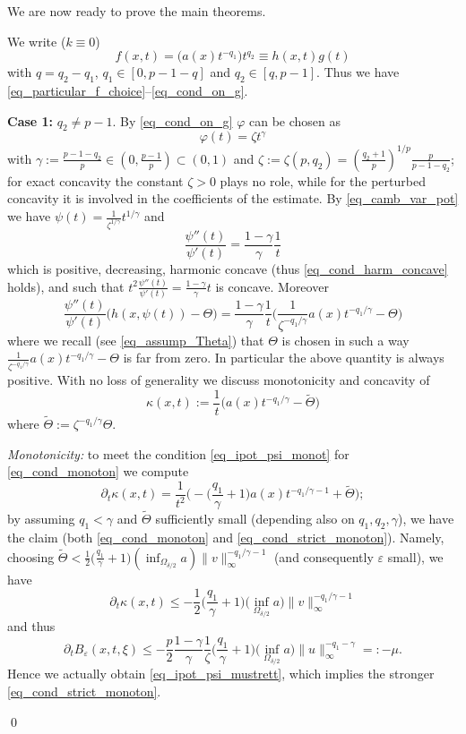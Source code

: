 \documentclass[11pt, reqno]{amsart}
\theoremstyle{definition}
\numberwithin{equation}{section}
\def\eps{\varepsilon}
\def\norm#1{\|#1\|}
\renewenvironment{proof}[1][\proofname]{\medskip \noindent {\bfseries #1. }}{\qed \bigskip}
\begin{document}
We are now ready to prove the main theorems.

\begin{proof}[Proof of Theorem \ref{thm_main_conc_exact}] 
We write ($k\equiv 0$)
\begin{equation}\label{eq_singular_decompos}
f(x,t) = \big(a(x) t^{-q_1}\big) t^{q_2} \equiv h(x,t) g(t) 
\end{equation}
with $ q= q_2 -q_1 $, $q_1 \in [0, p-1-q]$ and $q_2 \in [q,p-1]$. 
Thus we have \eqref{eq_particular_f_choice}--\eqref{eq_cond_on_g}.

\textbf{Case 1:} $q_2 \neq p-1$. By \eqref{eq_cond_on_g} $\varphi$ can be chosen as
\begin{equation}\label{eq_camb_var_pot}
\varphi(t)= \zeta t^{\gamma}
\end{equation}
with $\gamma := \frac{p-1-q_2}{p} \in (0,\frac{p-1}{p}) \subset (0,1)$ and $\zeta := \zeta(p,q_2)= \left(\frac{q_2+1}{p}\right)^{1/p} \frac{p}{p-1-q_2}$; for exact concavity the constant $\zeta>0$ plays no role, while for the perturbed concavity it is involved in the coefficients of the estimate. 
By \eqref{eq_camb_var_pot} we have $\psi(t)= \frac{1}{\zeta^{1/\gamma}} t^{1/\gamma}$ and
$$\frac{\psi''(t)}{\psi'(t)} = \frac{1-\gamma}{\gamma} \frac{1}{t}$$
which is positive, decreasing, harmonic concave (thus \eqref{eq_cond_harm_concave} holds), and such that $t^2\frac{\psi''(t)}{\psi'(t)} = \frac{1-\gamma}{\gamma} t$ is concave. 
Moreover
$$ \frac{\psi''(t)}{\psi'(t)} \big(h(x,\psi(t))-\Theta \big) = \frac{1-\gamma}{\gamma} \frac{1}{t} \bigg(\frac{1}{\zeta^{-q_1/\gamma}} a(x) t^{-q_1/\gamma} - \Theta \bigg)$$
where we recall (see \eqref{eq_assump_Theta}) that $\Theta$ is chosen in such a way $\frac{1}{\zeta^{-q_1/\gamma}} a(x) t^{-q_1/\gamma} - \Theta$ is far from zero. 
In particular the above quantity is always positive. 
With no loss of generality we discuss monotonicity and concavity of
$$\kappa(x,t):= \frac{1}{t} \big( a(x) t^{-q_1/\gamma} -\tilde{\Theta} \big)$$
where $\tilde{\Theta} := \zeta^{-q_1/\gamma} \Theta$.

\medskip

\emph{Monotonicity:} to meet the condition \eqref{eq_ipot_psi_monot} for \eqref{eq_cond_monoton} we compute
$$\partial_t \kappa(x,t)= \frac{1}{t^2} \Big(- \Big(\frac{q_1}{\gamma}+1\Big) a(x) t^{-q_1/\gamma-1} + \tilde{\Theta}\Big);$$
by assuming $q_1 < \gamma$ and $\tilde{\Theta}$ sufficiently small (depending also on $q_1, q_2, \gamma$), we have the claim (both \eqref{eq_cond_monoton} and \eqref{eq_cond_strict_monoton}). 
Namely, choosing $\tilde{\Theta} < \frac{1}{2} \big(\frac{q_1}{\gamma}+1\big) (\inf_{\Omega_{\delta/2}} a) \norm{v}_{\infty}^{-q_1/\gamma-1}$ (and consequently $\eps$ small), we have
$$\partial_t \kappa(x,t) \leq -\frac{1}{2} \Big(\frac{q_1}{\gamma}+1\Big) \Big(\inf_{\Omega_{\delta/2}} a\Big) \norm{v}_{\infty}^{-q_1/\gamma-1}$$
and thus
$$\partial_t B_{\eps}(x,t,\xi) \leq - \frac{p}{2} \frac{1-\gamma}{\gamma} \frac{1}{\zeta} \Big(\frac{q_1}{\gamma}+1\Big) \Big(\inf_{\Omega_{\delta/2}} a\Big) \norm{u}_{\infty}^{-q_1-\gamma}=: - \mu .$$
Hence we actually obtain \eqref{eq_ipot_psi_mustrett}, which implies the stronger \eqref{eq_cond_strict_monoton}.


\end{proof}
\end{document}
